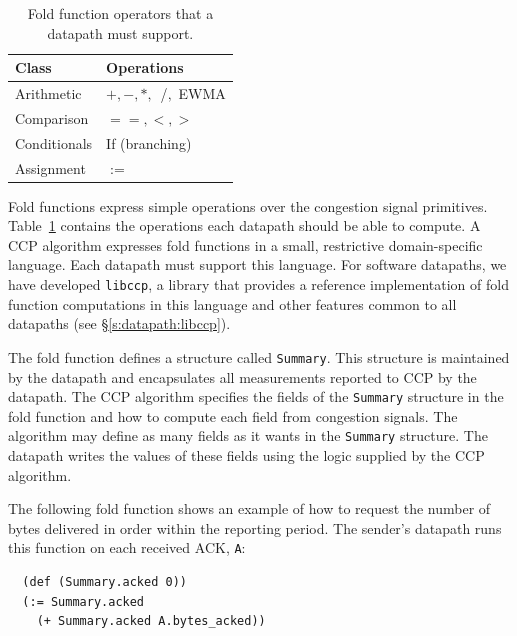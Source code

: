 \begin{table}
    \centering
    \footnotesize
    \begin{tabular}{p{}p{}}
      \textbf{Class} & \textbf{Operations} \\
      \hline
        Arithmetic & $+, -, *,$~/$,$ EWMA \\
        Comparison & $==, <, >$ \\
        Conditionals & If (branching) \\
        Assignment & $:=$ \\
    \end{tabular}
    \caption{Fold function operators that a datapath must support.}\label{tab:datapath:operators}
\end{table}


Fold functions express simple operations over the congestion signal primitives. Table~\ref{tab:datapath:operators} contains the operations each datapath should be able to compute. A CCP algorithm expresses fold functions in a small, restrictive domain-specific language. Each datapath must support this language. For software datapaths, we have developed \texttt{libccp}, a library that provides a reference implementation of fold function computations in this language and other features common to all datapaths (see \S\ref{s:datapath:libccp}). 

The fold function defines a structure called \texttt{Summary}. This structure is maintained by the datapath and encapsulates all measurements reported to CCP by the datapath. The CCP algorithm specifies the fields of the \texttt{Summary} structure in the fold function and how to compute each field from congestion signals. The algorithm may define as many fields as it wants in the \texttt{Summary} structure. The datapath writes the values of these fields using the logic supplied by the CCP algorithm.

The following fold function shows an example of how to request the number of bytes delivered in order within the reporting period. The sender's datapath runs this function on each received ACK, \texttt{A}:

\begin{verbatim}
  (def (Summary.acked 0))
  (:= Summary.acked
    (+ Summary.acked A.bytes_acked))
\end{verbatim}


